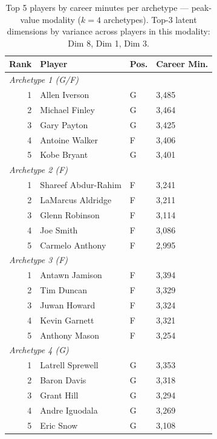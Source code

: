 \begin{table}[htbp]
  \centering\small
  \begin{tabular}{rlll}
    \toprule
    Rank & Player & Pos. & Career Min. \\
    \midrule
    \multicolumn{4}{l}{\textit{Archetype 1 (G/F)}} \\
    \midrule
    1 & Allen Iverson & G & 3,485 \\
    2 & Michael Finley & G & 3,464 \\
    3 & Gary Payton & G & 3,425 \\
    4 & Antoine Walker & F & 3,406 \\
    5 & Kobe Bryant & G & 3,401 \\
    \midrule[0.4pt]
    \multicolumn{4}{l}{\textit{Archetype 2 (F)}} \\
    \midrule
    1 & Shareef Abdur-Rahim & F & 3,241 \\
    2 & LaMarcus Aldridge & F & 3,211 \\
    3 & Glenn Robinson & F & 3,114 \\
    4 & Joe Smith & F & 3,086 \\
    5 & Carmelo Anthony & F & 2,995 \\
    \midrule[0.4pt]
    \multicolumn{4}{l}{\textit{Archetype 3 (F)}} \\
    \midrule
    1 & Antawn Jamison & F & 3,394 \\
    2 & Tim Duncan & F & 3,329 \\
    3 & Juwan Howard & F & 3,324 \\
    4 & Kevin Garnett & F & 3,321 \\
    5 & Anthony Mason & F & 3,254 \\
    \midrule[0.4pt]
    \multicolumn{4}{l}{\textit{Archetype 4 (G)}} \\
    \midrule
    1 & Latrell Sprewell & G & 3,353 \\
    2 & Baron Davis & G & 3,318 \\
    3 & Grant Hill & G & 3,294 \\
    4 & Andre Iguodala & G & 3,269 \\
    5 & Eric Snow & G & 3,108 \\
    \bottomrule
  \end{tabular}
  \caption{Top 5 players by career minutes per archetype --- peak-value modality ($k=4$ archetypes). Top-3 latent dimensions by variance across players in this modality: Dim 8, Dim 1, Dim 3.}
  \label{tab:arch_reps_peak_value}
\end{table}

